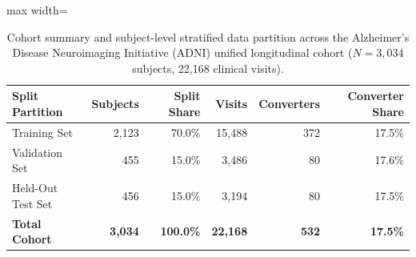 \begin{table}[t]
\centering
\caption{Cohort summary and subject-level stratified data partition across the Alzheimer's Disease Neuroimaging Initiative (ADNI) unified longitudinal cohort ($N=3,034$ subjects, 22,168 clinical visits).}
\label{tab:cohort_splits}
\small
\begin{adjustbox}{max width=\linewidth}
\begin{tabular}{lrrrrr}
\toprule
\textbf{Split Partition} & \textbf{Subjects} & \textbf{Split Share} & \textbf{Visits} & \textbf{Converters} & \textbf{Converter Share} \\
\midrule
Training Set             & 2,123             & 70.0\%               & 15,488          & 372                 & 17.5\% \\
Validation Set           & 455               & 15.0\%               & 3,486           & 80                  & 17.6\% \\
Held-Out Test Set        & 456               & 15.0\%               & 3,194           & 80                  & 17.5\% \\
\midrule
\textbf{Total Cohort}    & \textbf{3,034}    & \textbf{100.0\%}     & \textbf{22,168} & \textbf{532}        & \textbf{17.5\%} \\
\bottomrule
\end{tabular}
\end{adjustbox}
\end{table}
